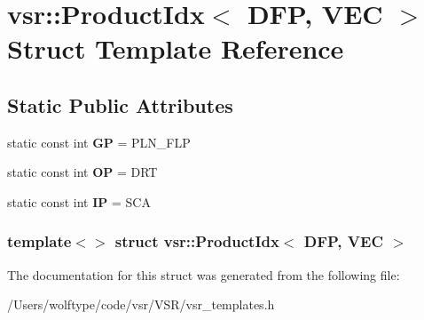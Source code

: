 \hypertarget{structvsr_1_1_product_idx_3_01_d_f_p_00_01_v_e_c_01_4}{\section{vsr\-:\-:Product\-Idx$<$ D\-F\-P, V\-E\-C $>$ Struct Template Reference}
\label{structvsr_1_1_product_idx_3_01_d_f_p_00_01_v_e_c_01_4}
}
\subsection*{Static Public Attributes}
\begin{DoxyCompactItemize}
\item 
\hypertarget{structvsr_1_1_product_idx_3_01_d_f_p_00_01_v_e_c_01_4_a93b0bfbbbc70ca7f7b2c13abb47a0603}{static const int {\bfseries G\-P} = P\-L\-N\-\_\-\-F\-L\-P}\label{structvsr_1_1_product_idx_3_01_d_f_p_00_01_v_e_c_01_4_a93b0bfbbbc70ca7f7b2c13abb47a0603}

\item 
\hypertarget{structvsr_1_1_product_idx_3_01_d_f_p_00_01_v_e_c_01_4_ad24dcb85b2a636ccc98e25a85376a846}{static const int {\bfseries O\-P} = D\-R\-T}\label{structvsr_1_1_product_idx_3_01_d_f_p_00_01_v_e_c_01_4_ad24dcb85b2a636ccc98e25a85376a846}

\item 
\hypertarget{structvsr_1_1_product_idx_3_01_d_f_p_00_01_v_e_c_01_4_a2336ceba0728ea3fe779c4fea916e955}{static const int {\bfseries I\-P} = S\-C\-A}\label{structvsr_1_1_product_idx_3_01_d_f_p_00_01_v_e_c_01_4_a2336ceba0728ea3fe779c4fea916e955}

\end{DoxyCompactItemize}
\subsubsection*{template$<$$>$ struct vsr\-::\-Product\-Idx$<$ D\-F\-P, V\-E\-C $>$}



The documentation for this struct was generated from the following file\-:\begin{DoxyCompactItemize}
\item 
/\-Users/wolftype/code/vsr/\-V\-S\-R/vsr\-\_\-templates.\-h\end{DoxyCompactItemize}

